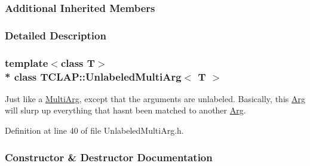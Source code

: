 \subsubsection*{Additional Inherited Members}


\subsubsection{Detailed Description}
\subsubsection*{template$<$class T$>$\\*
class T\+C\+L\+A\+P\+::\+Unlabeled\+Multi\+Arg$<$ T $>$}

Just like a \hyperlink{classTCLAP_1_1MultiArg}{Multi\+Arg}, except that the arguments are unlabeled. Basically, this \hyperlink{classTCLAP_1_1Arg}{Arg} will slurp up everything that hasn\textquotesingle{}t been matched to another \hyperlink{classTCLAP_1_1Arg}{Arg}. 

Definition at line 40 of file Unlabeled\+Multi\+Arg.\+h.



\subsubsection{Constructor \& Destructor Documentation}
